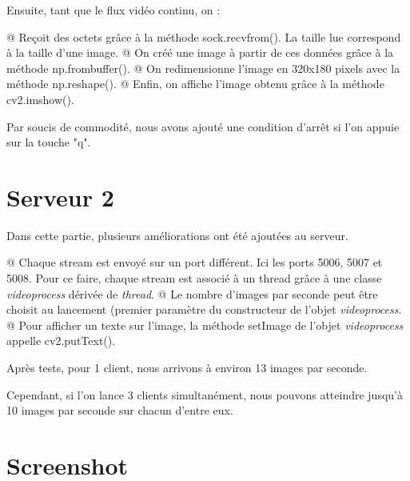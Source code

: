 \documentclass{report}
\begin{document}
			Ensuite, tant que le flux vidéo continu, on :
			\begin{easylist}[itemize]
				@ Reçoit des octets grâce à la méthode sock.recvfrom(). La taille lue correspond à la taille d'une image.
				@ On créé une image à partir de ces données grâce à la méthode np.frombuffer().
				@ On redimensionne l'image en 320x180 pixels avec la méthode np.reshape().
				@ Enfin, on affiche l'image obtenu grâce à la méthode cv2.imshow().
			\end{easylist}
	
			Par soucis de commodité, nous avons ajouté une condition d'arrêt si l'on appuie sur la touche "q".
	
		\section{Serveur 2}
			Dans cette partie, plusieurs améliorations ont été ajoutées au serveur.
	
			\begin{easylist}[itemize]
				@ Chaque stream est envoyé sur un port différent. Ici les ports 5006, 5007 et 5008. Pour ce faire, chaque stream est associé à un thread grâce à une classe \textit{videoprocess} dérivée de \textit{thread}.
				@ Le nombre d'images par seconde peut être choisit au lancement (premier paramètre du constructeur de l'objet \textit{videoprocess}.
				@ Pour afficher un texte sur l'image, la méthode setImage de l'objet \textit{videoprocess} appelle cv2.putText().
			\end{easylist}
	
			Après tests, pour 1 client, nous arrivons à environ 13 images par seconde.
			
			Cependant, si l'on lance 3 clients simultanément, nous pouvons atteindre jusqu'à 10 images par seconde sur chacun d'entre eux.
			
		\section{Screenshot}
		
\end{document}
